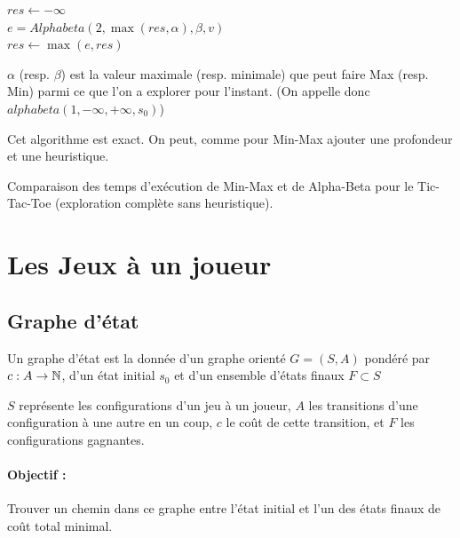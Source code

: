 \begin{algorithm}[H]
	\caption{$Alphabeta(j, \alpha, \beta, u)$}
		{}
	{
		$res \gets -\infty$\\
		{
			$e = Alphabeta(2, \max(res, \alpha), \beta, v)$\\
				{\quad {}}
				{$res \gets \max(e, res)$}
		}
	}
	{
	}
\end{algorithm}

\begin{idee}
	$\alpha$ (resp. $\beta$) est la valeur maximale (resp. minimale) que peut faire Max (resp. Min) parmi ce que l'on a explorer pour l'instant. (On appelle donc $alphabeta(1, -\infty, +\infty, s_0)$)
\end{idee}

\begin{rem}
	Cet algorithme est exact. On peut, comme pour Min-Max ajouter une profondeur et une heuristique.
\end{rem}

\begin{exercise}
	Comparaison des temps d'exécution de Min-Max et de Alpha-Beta pour le Tic-Tac-Toe (exploration complète sans heuristique).
\end{exercise}

\section{Les Jeux à un joueur}

\subsection{Graphe d'état}

\begin{definition}
	Un graphe d'état est la donnée d'un graphe orienté $G = (S, A)$ pondéré par $c : A \to \mathbb{N}$, d'un état initial $s_0$ et d'un ensemble d'états finaux $F \subset S$
\end{definition}

\begin{rem}
	$S$ représente les configurations d'un jeu à un joueur, $A$ les transitions d'une configuration à une autre en un coup, $c$ le coût de cette transition, et $F$ les configurations gagnantes. 
\end{rem}

\paragraph{Objectif :} Trouver un chemin dans ce graphe entre l'état initial et l'un des états finaux de coût total minimal.

